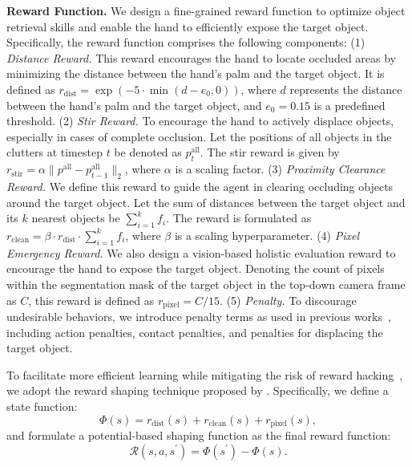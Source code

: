 \documentclass[10pt, a4paper, logo, twocolumn, copyright]{psibot} %
\begin{document}
\noindent \textbf{Reward Function.} We design a fine-grained reward function to optimize object retrieval skills and enable the hand to efficiently expose the target object. Specifically, the reward function comprises the following components: (1) \textit{Distance Reward.} This reward encourages the hand to locate occluded areas by minimizing the distance between the hand’s palm and the target object. It is defined as $r_\textrm{dist} = \exp(-5 \cdot \min(d - e_0, 0))$, where $d$ represents the distance between the hand’s palm and the target object, and $e_0 = 0.15$ is a predefined threshold. (2) \textit{Stir Reward.} To encourage the hand to actively displace objects, especially in cases of complete occlusion. Let the positions of all objects in the clutters at timestep $t$ be denoted as $p^\textrm{all}_t$. The stir reward is given by $r_\textrm{stir} = \alpha \|p^\textrm{all} - p^\textrm{all}_{t-1}\|_2$, where $\alpha$ is a scaling factor. (3) \textit{Proximity Clearance Reward.} We define this reward to guide the agent in clearing occluding objects around the target object. Let the sum of distances between the target object and its $k$ nearest objects be $\sum_{i=1}^{k} f_i$. The reward is formulated as $r_\textrm{clean} = \beta \cdot r_\textrm{dist} \cdot \sum_{i=1}^{k} f_i$, where $\beta$ is a scaling hyperparameter. (4) \textit{Pixel Emergency Reward.} We also design a vision-based holistic evaluation reward to encourage the hand to expose the target object. Denoting the count of pixels within the segmentation mask of the target object in the top-down camera frame as $C$, this reward is defined as $r_\textrm{pixel} = C/{15}$. (5) \textit{Penalty.} To discourage undesirable behaviors, we introduce penalty terms as used in previous works~\cite{pmlr-v229-chen23e, pmlr-v229-huang23d, lin2024twisting}, including action penalties, contact penalties, and penalties for displacing the target object.  

To facilitate more efficient learning while mitigating the risk of reward hacking~\cite{amodei2016concrete}, we adopt the reward shaping technique proposed by \citet{10.5555/645528.657613}. Specifically, we define a state function:
\begin{equation}
    \Phi(s) = r_\textrm{dist}(s) + r_\textrm{clean}(s) + r_\textrm{pixel}(s),
\end{equation}
and formulate a potential-based shaping function as the final reward function:
\begin{equation}
    \mathcal{R}(s, a, s^\prime) = \Phi(s^\prime) - \Phi(s).
\end{equation}
\end{document}
